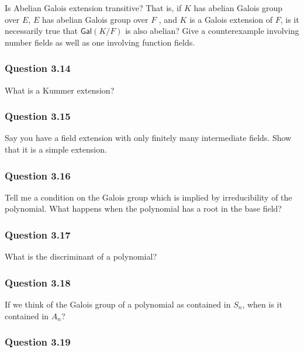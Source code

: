 Is Abelian Galois extension transitive? That is, if \(K\) has abelian
Galois group over \(E\), \(E\) has abelian Galois group over \(F\) , and
\(K\) is a Galois extension of \(F\), is it necessarily true that
\({ \mathsf{Gal}} (K/F)\) is also abelian? Give a counterexample
involving number fields as well as one involving function fields.

\hypertarget{question-3.14}{%
\subsubsection{Question 3.14}\label{question-3.14}}

What is a Kummer extension?

\hypertarget{question-3.15}{%
\subsubsection{Question 3.15}\label{question-3.15}}

Say you have a field extension with only finitely many intermediate
fields. Show that it is a simple extension.

\hypertarget{question-3.16}{%
\subsubsection{Question 3.16}\label{question-3.16}}

Tell me a condition on the Galois group which is implied by
irreducibility of the polynomial. What happens when the polynomial has a
root in the base field?

\hypertarget{question-3.17}{%
\subsubsection{Question 3.17}\label{question-3.17}}

What is the discriminant of a polynomial?

\hypertarget{question-3.18}{%
\subsubsection{Question 3.18}\label{question-3.18}}

If we think of the Galois group of a polynomial as contained in \(S_n\),
when is it contained in \(A_n\)?

\hypertarget{question-3.19}{%
\subsubsection{Question 3.19}\label{question-3.19}}

